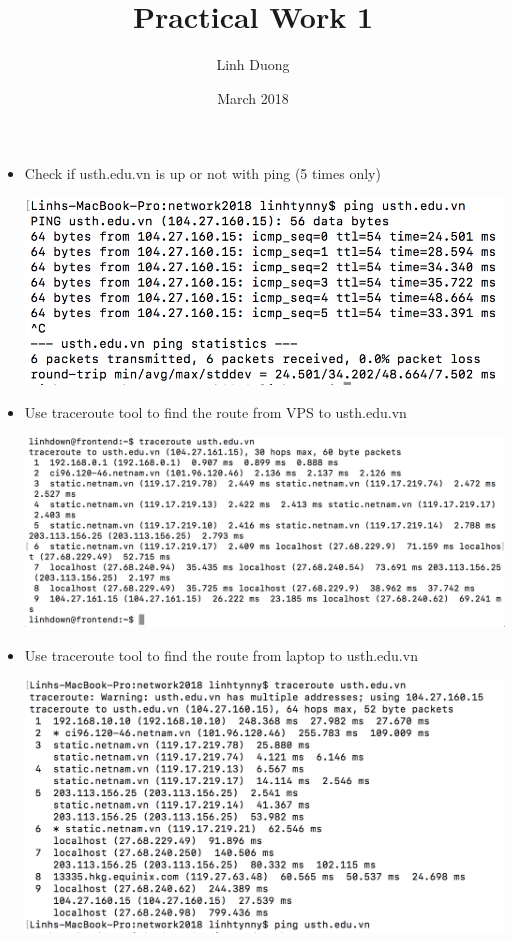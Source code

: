 \documentclass{article}
\title{Practical Work 1}
\author{Linh Duong}
\date{March 2018}
\begin{document}
\maketitle

\bigskip

\begin{itemize}
    \item Check if usth.edu.vn is up or not with ping (5 times only)
    
\includegraphics[width=\linewidth]{ping}

\bigskip


 \item Use traceroute tool to find the route from VPS to usth.edu.vn
 
\includegraphics[width=\linewidth]{VPStraceroute}

\bigskip


 \item Use traceroute tool to find the route from laptop to usth.edu.vn
 
\includegraphics[width=\linewidth]{traceroute}

\end{itemize}
\end{document}
